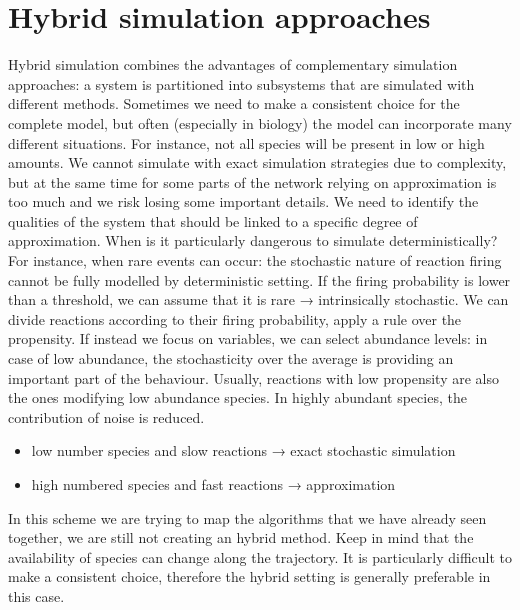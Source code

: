 \graphicspath{{chapters/06/images}}
\chapter{Hybrid simulation approaches}
Hybrid simulation combines the advantages of complementary simulation approaches: a system is partitioned into subsystems that are simulated with different methods.
Sometimes we need to make a consistent choice for the complete model, but often (especially in biology) the model can incorporate many different situations.
For instance, not all species will be present in low or high amounts.
We cannot simulate with exact simulation strategies due to complexity, but at the same time for some parts of the network relying on approximation is too much and we risk losing some important details.
We need to identify the qualities of the system that should be linked to a specific degree of approximation.
When is it particularly dangerous to simulate deterministically? For instance, when rare events can occur: the stochastic nature of reaction firing cannot be fully modelled by deterministic setting.
If the firing probability is lower than a threshold, we can assume that it is rare → intrinsically stochastic.
We can divide reactions according to their firing probability, apply a rule over the propensity.
If instead we focus on variables, we can select abundance levels: in case of low abundance, the stochasticity over the average is providing an important part of the behaviour.
Usually, reactions with low propensity are also the ones modifying low abundance species.
In highly abundant species, the contribution of noise is reduced.

\begin{itemize}
  \item low number species and slow reactions → exact stochastic simulation
  \item high numbered species and fast reactions → approximation
\end{itemize}

In this scheme we are trying to map the algorithms that we have already seen together, we are still not creating an hybrid method.
Keep in mind that the availability of species can change along the trajectory.
It is particularly difficult to make a consistent choice, therefore the hybrid setting is generally preferable in this case.

